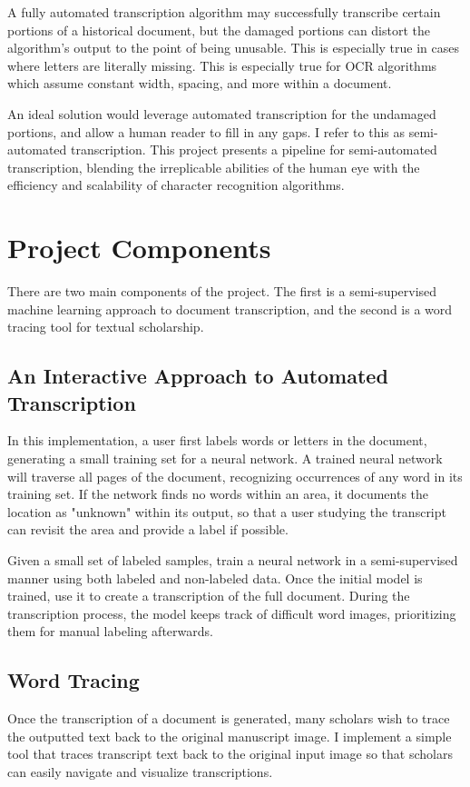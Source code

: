\documentclass[final]{ukthesis}
\begin{document}
A fully automated transcription algorithm may successfully transcribe certain portions of a historical document, but the damaged portions can distort the algorithm's output to the point of being unusable. This is especially true in cases where letters are literally missing. This is especially true for OCR algorithms which assume constant width, spacing, and more within a document.

An ideal solution would leverage automated transcription for the undamaged portions, and allow a human reader to fill in any gaps. I refer to this as semi-automated transcription. This project presents a pipeline for semi-automated transcription, blending the irreplicable abilities of the human eye with the efficiency and scalability of character recognition algorithms.


\section{Project Components}
There are two main components of the project. The first is a semi-supervised machine learning approach to document transcription, and the second is a word tracing tool for textual scholarship.

\subsection{An Interactive Approach to Automated Transcription}
In this implementation, a user first labels words or letters in the document, generating a small training set for a neural network. A trained neural network will traverse all pages of the document, recognizing occurrences of any word in its training set. If the network finds no words within an area, it documents the location as "unknown" within its output, so that a user studying the transcript can revisit the area and provide a label if possible.

Given a small set of labeled samples, train a neural network in a semi-supervised manner using both labeled and non-labeled data. Once the initial model is trained, use it to create a transcription of the full document. During the transcription process, the model keeps track of difficult word images, prioritizing them for manual labeling afterwards.

\subsection{Word Tracing}
Once the transcription of a document is generated, many scholars wish to trace the outputted text back to the original manuscript image. I implement a simple tool that traces transcript text back to the original input image so that scholars can easily navigate and visualize transcriptions.
\end{document}
